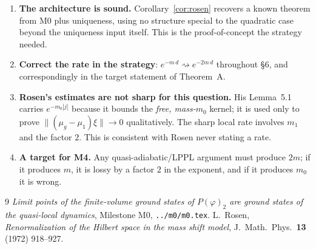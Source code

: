 \documentclass[11pt,a4paper]{article}
\theoremstyle{plain}
\theoremstyle{definition}
\begin{document}
\begin{enumerate}
\item \textbf{The architecture is sound.} Corollary~\ref{cor:rosen} recovers a known theorem from
      M0 plus uniqueness, using no structure special to the quadratic case beyond the uniqueness
      input itself. This is the proof-of-concept the strategy needed.
\item \textbf{Correct the rate in the strategy}: $e^{-m\,d}\rightsquigarrow e^{-2m\,d}$
      throughout \S6, and correspondingly in the target statement of Theorem~A.
\item \textbf{Rosen's estimates are not sharp for this question.} His Lemma~5.1 carries
      $e^{-m_0|j|}$ because it bounds the \emph{free, mass-$m_0$} kernel; it is used only to prove
      $\|(\mu_g-\mu_1)\xi\|\to0$ qualitatively. The sharp local rate involves $m_1$ and the factor
      $2$. This is consistent with Rosen never stating a rate.
\item \textbf{A target for M4.} Any quasi-adiabatic/LPPL argument must produce $2m$; if it
      produces $m$, it is lossy by a factor $2$ in the exponent, and if it produces $m_0$ it is
      wrong.
\end{enumerate}

\begin{thebibliography}{9}
 \emph{Limit points of the finite-volume ground states of $P(\varphi)_2$ are ground
states of the quasi-local dynamics}, Milestone M0, \texttt{../m0/m0.tex}.
 L.~Rosen, \emph{Renormalization of the Hilbert space in the mass shift model},
J.\ Math.\ Phys.\ \textbf{13} (1972) 918--927.
\end{thebibliography}
\end{document}
